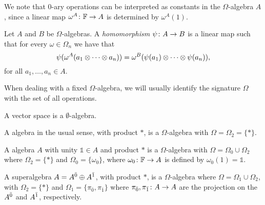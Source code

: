 We note that $0$-ary operations can be interpreted as constants in the $\Omega$-algebra $A$, since a linear map $\omega^A\colon \mathbb{F} \to A$ is determined by $\omega^A(1)$.

\begin{defi}
    Let $A$ and $B$ be $\Omega$-algebras. 
    A \emph{homomorphism} $\psi\colon A \to B$ is a linear map such that for every $\omega \in \Omega_n$ we have that
    \[
        \psi( \omega^A (a_1 \otimes \cdots \otimes a_n) ) = \omega^B ( \psi(a_1) \otimes \cdots \otimes \psi(a_n) ),
    \]
    for all $a_1, \ldots, a_n \in A$.
\end{defi}

When dealing with a fixed $\Omega$-algebra, we will usually identify the signature $\Omega$ with the set of all operations.

\begin{ex}
    A vector space is a $\emptyset$-algebra.
\end{ex}

\begin{ex}
    A algebra in the usual sense, with product $*$, is a $\Omega$-algebra with $\Omega = \Omega_2 = \{ * \}$. 
\end{ex}

\begin{ex}
    A algebra $A$ with unity $\mathds{1} \in A$ and product $*$ is a  $\Omega$-algebra with $\Omega = \Omega_0 \cup \Omega_2$ where $\Omega_2 = \{ * \}$ and $\Omega_0 = \{ \omega_0 \}$, where $\omega_0\colon \mathbb{F} \to A$ is defined by $\omega_0 (1) = \mathds 1$.
\end{ex}

\begin{ex}
    A superalgebra $A = A^{\bar0} \oplus A^{\bar1}$, with product $*$, is a $\Omega$-algebra where $\Omega = \Omega_1 \cup \Omega_2$, with $\Omega_2 = \{ * \}$ and $\Omega_1 = \{ \pi_{\bar 0}, \pi_{\bar 1} \}$ where $\pi_{\bar 0}, \pi_{\bar 1}\colon A \to A$ are the projection on the $A^{\bar0}$ and $A^{\bar1}$, respectively. 
\end{ex}

